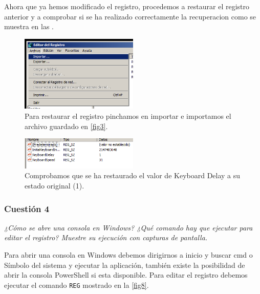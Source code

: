 Ahora que ya hemos modificado el registro, procedemos a restaurar el registro anterior y a comprobar si se ha realizado correctamente la recuperacion como se muestra en las .
\begin{figure}[H]
  \begin{center}
    \includegraphics[width=0.5\textwidth]{imagenes/6}
    \caption{Para restaurar el registro pinchamos en importar e importamos el archivo guardado en \ref{fig3}.}
    \label{fig6}
  \end{center}
\end{figure}

\begin{figure}[H]
  \begin{center}
    \includegraphics[width=0.5\textwidth]{imagenes/7}
    \caption{Comprobamos que se ha restaurado el valor de Keyboard Delay a su estado original (1).}
    \label{fig7}
  \end{center}
\end{figure}



\subsubsection{Cuestión 4}
\textit{¿Cómo se abre una consola en Windows? ¿Qué comando hay que ejecutar para editar el registro? Muestre su ejecución con capturas de pantalla.}
\newline

Para abrir una consola en Windows debemos dirigirnos a inicio y buscar cmd o Símbolo del sistema y ejecutar la aplicación, también existe la posibilidad de abrir la consola PowerShell si esta disponible.\cite{cmd} Para editar el registro debemos ejecutar el comando \texttt{REG} \cite{reg1}\cite{reg2} mostrado en la \cref{fig8}.

